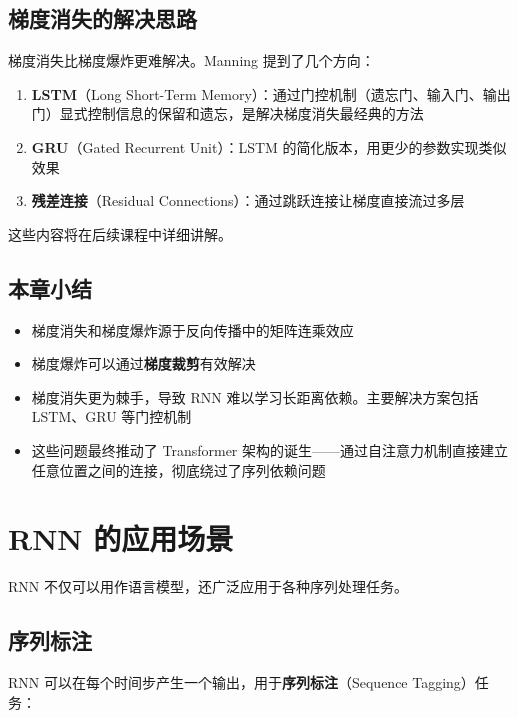 \documentclass[a4paper]{article}
\begin{document}
\subsection{梯度消失的解决思路}

梯度消失比梯度爆炸更难解决。Manning 提到了几个方向：

\begin{enumerate}
    \item \textbf{LSTM}（Long Short-Term Memory）：通过门控机制（遗忘门、输入门、输出门）显式控制信息的保留和遗忘，是解决梯度消失最经典的方法
    \item \textbf{GRU}（Gated Recurrent Unit）：LSTM 的简化版本，用更少的参数实现类似效果
    \item \textbf{残差连接}（Residual Connections）：通过跳跃连接让梯度直接流过多层
\end{enumerate}

这些内容将在后续课程中详细讲解。

\subsection{本章小结}

\begin{itemize}
    \item 梯度消失和梯度爆炸源于反向传播中的矩阵连乘效应
    \item 梯度爆炸可以通过\textbf{梯度裁剪}有效解决
    \item 梯度消失更为棘手，导致 RNN 难以学习长距离依赖。主要解决方案包括 LSTM、GRU 等门控机制
    \item 这些问题最终推动了 Transformer 架构的诞生——通过自注意力机制直接建立任意位置之间的连接，彻底绕过了序列依赖问题
\end{itemize}


\section{RNN 的应用场景}

RNN 不仅可以用作语言模型，还广泛应用于各种序列处理任务。

\subsection{序列标注}

RNN 可以在每个时间步产生一个输出，用于\textbf{序列标注}（Sequence Tagging）任务：
\end{document}

